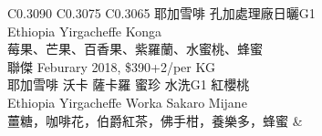\documentclass[10pt,a4paper]{article}
\begin{document}
\begin{tabular}{C{0.3090\textwidth} C{0.3075\textwidth} C{0.3065\textwidth}}
{%
耶加雪啡 孔加處理廠日曬G1 \vspace*{-0.12em} \\ Ethiopia Yirgacheffe  Konga%
 \vspace*{-0.22em} \\ %
\footnotesize 莓果、芒果、百香果、紫羅蘭、水蜜桃、蜂蜜%
\vspace*{0.345em}\\%
聯傑 Feburary  2018,  \$390+2/per KG \vspace*{-0.2em} \\ %
耶加雪啡 沃卡 薩卡羅 蜜珍 水洗G1 紅櫻桃 \vspace*{-0.12em} \\ Ethiopia Yirgacheffe Worka Sakaro Mijane%
 \vspace*{-0.22em} \\ %
\footnotesize 薑糖，咖啡花，伯爵紅茶，佛手柑，養樂多，蜂蜜%
%
}& \shortstack[c]{
%
%
}
\end{tabular}
\end{document}

